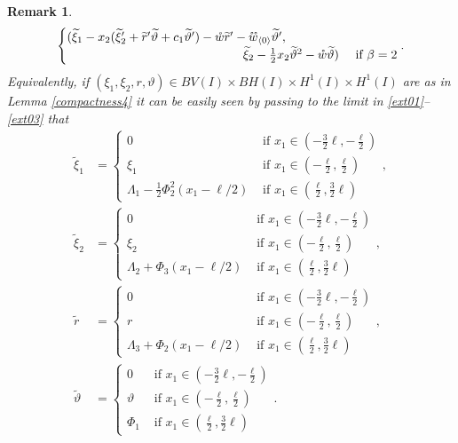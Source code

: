 \documentclass[a4, 11pt, reqno, final]{amsart}
\newcommand\ringring[1]{%
	{%
		\mathop{\kern0pt #1}\limits^{%
			\vbox to-1.85ex{
				\kern-2ex %
				\hbox to 0pt{\hss\normalfont\kern.1em \r{}\kern-.45em \r{}\hss}%
				\vss %
			}%
		}%
	}%
}
\theoremstyle{plain}%
\newtheorem{remark}[theorem]{Remark}
\begin{document}
\begin{remark}
\begin{equation}
\begin{cases}
				(\widetilde{\xi}_1 -x_2(\widetilde{\xi}_2'+\widetilde{r}'\widetilde{\vartheta} + c_1\widetilde{\vartheta}') - \mathring{w} \widetilde{r}'   -\ringring{w}_{\langle 0 \rangle}\widetilde{\vartheta}',\\
				\hspace{5cm}		\widetilde{\xi}_2 - \frac12 x_2 \widetilde{\vartheta}^2 - \mathring{w}\widetilde{\vartheta}) & \text{ if } \beta = 2
			\end{cases}.
		\end{equation}
		Equivalently, if $(\xi_1, \xi_2, r, \vartheta) \in BV(I)\times BH(I)\times H^1(I) \times H^1(I)$ are as in Lemma \ref{compactness4} it can be easily seen by passing to the limit in \eqref{ext01}--\eqref{ext03} that
		\begin{align}
			\widetilde{\xi}_1 &= \begin{cases}
				0 & \text{ if } x_1 \in (-\frac{3}{2}\ell, -\frac{\ell}{2})\\
				\xi_1 & \text{ if } x_1 \in (-\frac{\ell}{2}, \frac{\ell}{2})\\
				\Lambda_1 - \frac12 \Phi_2^2(x_1-\ell/2)
				& \text{ if } x_1 \in (\frac{\ell}{2}, \frac{3}{2}\ell)
			\end{cases},\label{ext1}\\
			\widetilde{\xi}_2 &= \begin{cases}
				0 & \text{ if } x_1 \in (-\frac{3}{2}\ell, -\frac{\ell}{2})\\
				\xi_2 & \text{ if } x_1 \in (-\frac{\ell}{2}, \frac{\ell}{2})\\
				\Lambda_2 + \Phi_3(x_1-\ell/2) & \text{ if } x_1 \in (\frac{\ell}{2}, \frac{3}{2}\ell)
			\end{cases},\label{ext2}\\
			\widetilde{r} &= \begin{cases}
				0 & \text{ if } x_1 \in (-\frac{3}{2}\ell, -\frac{\ell}{2})\\
				r & \text{ if } x_1 \in (-\frac{\ell}{2}, \frac{\ell}{2})\\
				\Lambda_3 + \Phi_2(x_1-\ell/2) & \text{ if } x_1 \in (\frac{\ell}{2}, \frac{3}{2}\ell)
			\end{cases},\label{ext3}\\
			\widetilde{\vartheta}&= \begin{cases}
				0 & \text{ if } x_1 \in (-\frac{3}{2}\ell, -\frac{\ell}{2})\\
				\vartheta & \text{ if } x_1 \in (-\frac{\ell}{2}, \frac{\ell}{2})\\
				\Phi_1 & \text{ if } x_1 \in (\frac{\ell}{2}, \frac{3}{2}\ell)
			\end{cases}.\label{ext4}\end{align}


	\end{remark}
\end{document}
